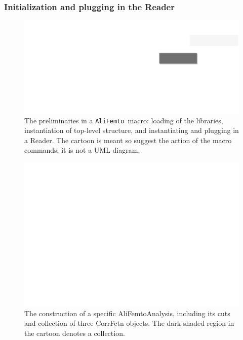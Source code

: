 \documentclass[twoside]{article}
\newcommand{\name}[1]{\textsf{#1}}%
\newcommand{\AliFemto}{{\tt AliFemto }}
\begin{document}
\subsubsection{Initialization and plugging in the Reader}

\begin{figure}[t]
\includegraphics[width=\textwidth]{ExampleMacro1.pdf}
\caption{The preliminaries in a \AliFemto macro: loading of the libraries, instantiation of top-level structure, and
instantiating and plugging in a Reader.
The cartoon is meant so suggest the action of the macro commands; it is not a UML diagram.
\label{fig:exampleMacroGload}
}
\end{figure}

\begin{figure}[t]
\includegraphics[width=\textwidth]{ExampleMacro2.pdf}
\caption{The construction of a specific \name{AliFemtoAnalysis}, including its cuts and collection of three CorrFctn
objects.  The dark shaded region in the cartoon denotes a collection.
\label{fig:exampleFirstAnalysisStart}
}
\end{figure}
\end{document}
